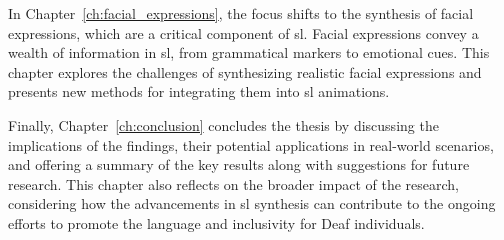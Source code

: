 \documentclass[../../main.tex]
{subfiles}
\begin{document}
In Chapter~\ref{ch:facial_expressions}, the focus shifts to the synthesis of facial expressions, which are a critical component of \gls{sl}. Facial expressions convey a wealth of information in \gls{sl}, from grammatical markers to emotional cues. This chapter explores the challenges of synthesizing realistic facial expressions and presents new methods for integrating them into \gls{sl} animations.

Finally, Chapter~\ref{ch:conclusion} concludes the thesis by discussing the implications of the findings, their potential applications in real-world scenarios, and offering a summary of the key results along with suggestions for future research. This chapter also reflects on the broader impact of the research, considering how the advancements in \gls{sl} synthesis can contribute to the ongoing efforts to promote the language and inclusivity for Deaf individuals.
\end{document}
